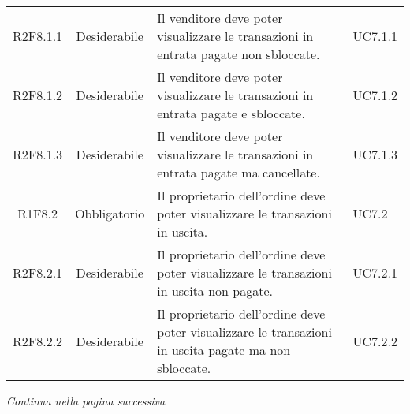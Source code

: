 \begin{table}[H]
\begin{tabular}{c | c | p{6cm} | p{4.1cm}}
        R2F8.1.1                                                          & Desiderabile & Il venditore deve poter visualizzare le transazioni in entrata pagate non sbloccate.                                  & UC7.1.1                          \\
        R2F8.1.2                                                          & Desiderabile & Il venditore deve poter visualizzare le transazioni in entrata pagate e sbloccate.                                    & UC7.1.2                          \\
        R2F8.1.3                                                          & Desiderabile & Il venditore deve poter visualizzare le transazioni in entrata pagate ma cancellate.                                  & UC7.1.3                          \\
        R1F8.2                                                            & Obbligatorio & Il proprietario dell'ordine deve poter visualizzare le transazioni in uscita.                                         & UC7.2                            \\
        R2F8.2.1                                                          & Desiderabile & Il proprietario dell'ordine deve poter visualizzare le transazioni in uscita non pagate.                              & UC7.2.1                          \\
        R2F8.2.2                                                          & Desiderabile & Il proprietario dell'ordine deve poter visualizzare le transazioni in uscita pagate ma non sbloccate.                 & UC7.2.2                          \\
    \end{tabular}
\end{table}
\begin{center}
    \textit{\small Continua nella pagina successiva}
\end{center}
